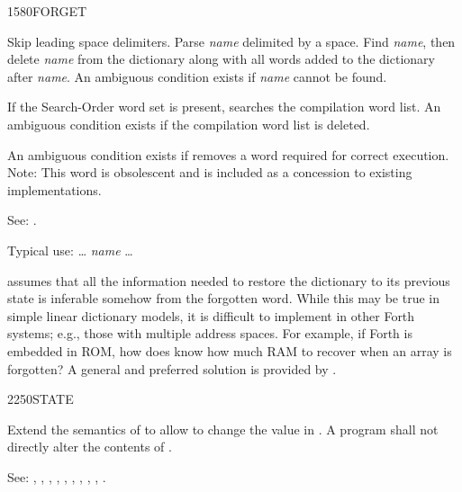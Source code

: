 \begin{newword}{1580}{FORGET}

	Skip leading space delimiters. Parse \emph{name} delimited by a
	space. Find \emph{name}, then delete \emph{name} from the
	dictionary along with all words added to the dictionary after
	\emph{name}. An ambiguous condition exists if \emph{name} cannot
	be found.

	If the Search-Order word set is present,  searches
	the compilation word list. An ambiguous condition exists if the
	compilation word list is deleted.

	An ambiguous condition exists if  removes a word
	required for correct execution. Note: This word is obsolescent
	and is included as a concession to existing implementations.

\item[See:]
	.

	\begin{rationale} %
		Typical use:
			{\ldots}  \emph{name} {\ldots}

		 assumes that all the information needed to
		restore the dictionary to its previous state is inferable
		somehow from the forgotten word. While this may be true in
		simple linear dictionary models, it is difficult to implement
		in other Forth systems; e.g., those with multiple address
		spaces. For example, if Forth is embedded in ROM, how does
		 know how much RAM to recover when an array
		is forgotten? A general and preferred solution is provided by
		.
	\end{rationale}
\end{newword}


\begin{newword}{2250}{STATE}

	Extend the semantics of  to allow
	 to change the value in . A program
	shall not directly alter the contents of .

\item[See:]
	,
	,
	,
	,
	,
	,
	\wref{core:[}{[},
	\wref{core:]}{]},
	,
	.
\end{newword}


